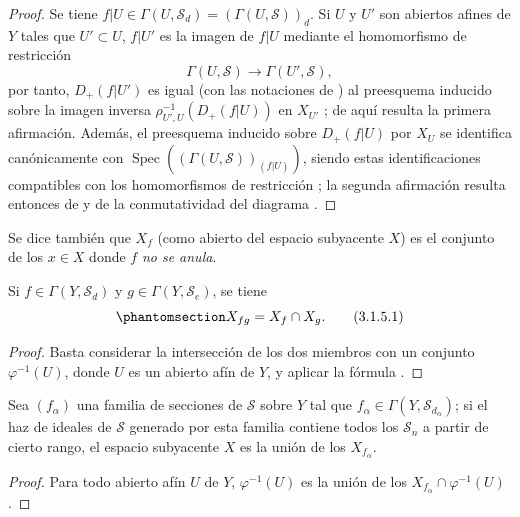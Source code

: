 \documentclass[oneside,10pt]{amsart}
\let\EGAOriginalLabel\label
\renewcommand{\label}[1]{\phantomsection\EGAOriginalLabel{#1}}
\begin{document}
\begin{proof}
Se tiene $f|U\in\Gamma(U,\mathcal{S}_d)=(\Gamma(U,\mathcal{S}))_d$.
Si $U$ y $U'$ son abiertos afines de $Y$ tales que $U'\subset U$, $f|U'$ es la imagen de $f|U$ mediante el homomorfismo de restricción
\[
  \Gamma(U,\mathcal{S})\longrightarrow\Gamma(U',\mathcal{S}),
\]
por tanto, $D_+(f|U')$ es igual (con las notaciones de ) al preesquema inducido sobre la imagen inversa $\rho_{U',U}^{-1}(D_+(f|U))$ en $X_{U'}$ ; de aquí resulta la primera afirmación.
Además, el preesquema inducido sobre $D_+(f|U)$ por $X_U$ se identifica canónicamente con $\operatorname{Spec}((\Gamma(U,\mathcal{S}))_{(f|U)})$, siendo estas identificaciones compatibles con los homomorfismos de restricción ; la segunda afirmación resulta entonces de  y de la conmutatividad del diagrama .
\end{proof}

Se dice también que $X_f$ (como abierto del espacio subyacente $X$) es el conjunto de los $x\in X$ donde $f$ \emph{no se anula}.

\begin{corollary}[3.1.5]
\label{II.3.1.5-fr}
Si $f\in\Gamma(Y,\mathcal{S}_d)$ y $g\in\Gamma(Y,\mathcal{S}_e)$, se tiene
\[
\label{II.3.1.5.1-fr}
  X_{fg}=X_f\cap X_g.
\tag{3.1.5.1}
\]
\end{corollary}

\begin{proof}
Basta considerar la intersección de los dos miembros con un conjunto $\varphi^{-1}(U)$, donde $U$ es un abierto afín de $Y$, y aplicar la fórmula .
\end{proof}

\begin{corollary}[3.1.6]
\label{II.3.1.6-fr}
Sea $(f_\alpha)$ una familia de secciones de $\mathcal{S}$ sobre $Y$ tal que $f_\alpha\in\Gamma(Y,\mathcal{S}_{d_\alpha})$; si el haz de ideales de $\mathcal{S}$ generado por esta familia  contiene todos los $\mathcal{S}_n$ a partir de cierto rango, el espacio subyacente $X$ es la unión de los $X_{f_\alpha}$.
\end{corollary}

\begin{proof}
Para todo abierto afín $U$ de $Y$, $\varphi^{-1}(U)$ es la unión de los $X_{f_\alpha}\cap\varphi^{-1}(U)$ .
\end{proof}
\end{document}
